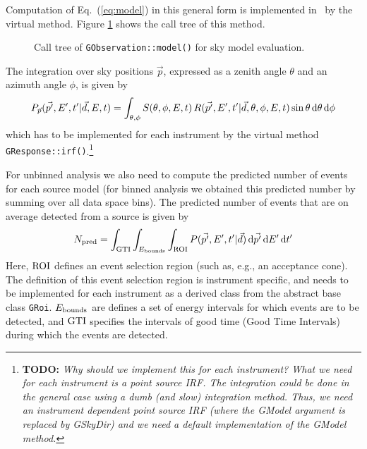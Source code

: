 \documentclass{article}[12pt,a4]
\begin{document}
Computation of Eq.~(\ref{eq:model}) in this general form is implemented in \this\ by the 
virtual method.
Figure \ref{fig:modeleval} shows the call tree of this method.

\begin{figure}[!t]
\center
{}
\caption{Call tree of {\tt GObservation::model()} for sky model evaluation.}
 \label{fig:modeleval}
\end{figure}

The integration over sky positions $\vec{p}$, expressed as a zenith angle $\theta$ and an
azimuth angle $\phi$, is given by
\begin{equation}
P_{\vec{p}}(\vec{p'}, E', t' | \vec{d}, E, t) = 
\int_{\theta, \phi} S(\theta, \phi, E, t) \, R(\vec{p'}, E', t' | \vec{d}, \theta, \phi, E, t)
\sin \theta \, {\rm d}\theta \, {\rm d}\phi
\label{eq:pirf}
\end{equation}
which has to be implemented for each instrument by the virtual method
{\tt GResponse::irf()}.\footnote{
  {\bf TODO:}
  {\em Why should we implement this for each instrument?
  What we need for each instrument is a point source IRF.
  The integration could be done in the general case using a dumb (and slow)
integration method.
  Thus, we need an instrument dependent point source IRF (where the GModel argument
is replaced by GSkyDir) and we need a default implementation of  the GModel method.}
}

For unbinned analysis we also need to compute the predicted number of events
for each source model (for binned analysis we obtained this predicted number by
summing over all data space bins).
The predicted number of events that are on average detected from a source is given by
\begin{equation}
N_{\rm pred} = \int_{\rm GTI} \int_{E_{\rm bounds}} \int_{\rm ROI} 
P(\vec{p'}, E', t' | \vec{d}) \, {\rm d}\vec{p'} \, {\rm d}E' \,{\rm d}t'
\label{eq:npred}
\end{equation}
Here, ${\rm ROI}$ defines an event selection region (such as, e.g., an acceptance cone).
The definition of this event selection region is instrument specific, and needs to be
implemented for each instrument as a derived class from the abstract base class {\tt GRoi}.
$E_{\rm bounds}$ are defines a set of energy intervals for which events are to be detected,
and ${\rm GTI}$ specifies the intervals of good time (Good Time Intervals) during which
the events are detected.
\end{document}
